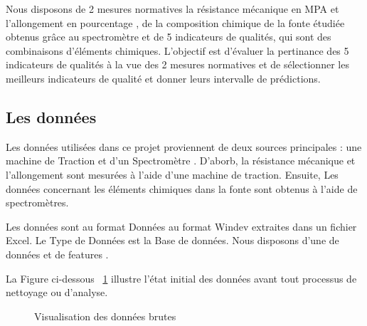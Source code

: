 \documentclass[12pt]{article}
\begin{document}
Nous disposons de 2 mesures normatives la résistance mécanique en MPA et l'allongement 
en pourcentage , de la composition chimique de la fonte étudiée obtenus grâce au 
spectromètre et de 5 indicateurs de qualités, qui sont des combinaisons d'éléments 
chimiques.
L'objectif est d'évaluer la pertinance des 5 indicateurs de qualités à la vue 
des 2 mesures normatives et de sélectionner  les meilleurs indicateurs de qualité 
et donner leurs intervalle de prédictions.


\subsection{Les données}


Les données utilisées dans ce projet proviennent de deux sources principales :
une machine de Traction et d'un Spectromètre . 
D'aborb, la résistance mécanique et l'allongement sont mesurées à l'aide d'une 
machine de traction. Ensuite, Les données concernant les éléments chimiques dans 
la fonte sont obtenus à l'aide de spectromètres.



Les données sont au format Données au format Windev extraites dans un fichier Excel.
Le Type de Données est la Base de données. Nous disposons d'une de données et de features .

La Figure ci-dessous ~\ref{fig:donnees_brutes}  illustre l'état initial des données avant tout 
processus de nettoyage ou d'analyse.


\begin{figure}[H]
    \centering
    \caption{Visualisation des données brutes}
    \label{fig:donnees_brutes}
\end{figure}



    
    
\end{document}
